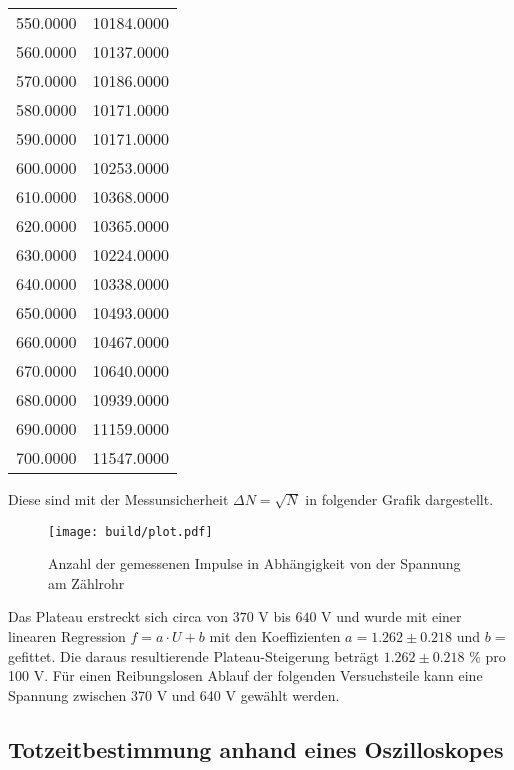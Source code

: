 \begin{table}[H]
\begin{tabular}{c c}
    550.0000 & 10184.0000 \\   
    560.0000 & 10137.0000 \\   
    570.0000 & 10186.0000 \\   
    580.0000 & 10171.0000 \\   
    590.0000 & 10171.0000 \\   
    600.0000 & 10253.0000 \\   
    610.0000 & 10368.0000 \\   
    620.0000 & 10365.0000 \\   
    630.0000 & 10224.0000 \\   
    640.0000 & 10338.0000 \\   
    650.0000 & 10493.0000 \\   
    660.0000 & 10467.0000 \\   
    670.0000 & 10640.0000 \\
    680.0000 & 10939.0000 \\   
    690.0000 & 11159.0000 \\
    700.0000 & 11547.0000 \\ 
    \bottomrule
    \end{tabular}
  \end{table}
  Diese sind mit der Messunsicherheit $\Delta N = \sqrt{N}$
  in folgender Grafik dargestellt.
  \begin{figure}[H]
    \centering
    \texttt{[image: build/plot.pdf]}
    \caption{Anzahl der gemessenen Impulse in Abhängigkeit von der Spannung am Zählrohr}
    \label{fig:plot}
  \end{figure}
  Das Plateau erstreckt sich circa von $370 $ V bis $640 $ V und wurde mit einer linearen 
  Regression $f = a\cdot U + b$ mit den Koeffizienten $a=1.262 \pm 0.218$ und $b=$ gefittet. 
  Die daraus resultierende Plateau-Steigerung beträgt $1.262 \pm 0.218$ \% pro 100 V. 
  Für einen Reibungslosen Ablauf der folgenden Versuchsteile kann eine Spannung zwischen
  370 V und 640 V gewählt werden.

\subsection{Totzeitbestimmung anhand eines Oszilloskopes}

